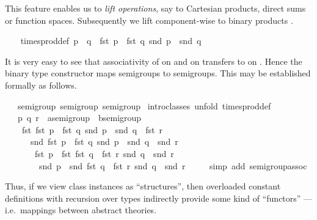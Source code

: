 \begin{isabellebody}
\begin{isamarkuptext}
 This feature enables us to \emph{lift operations}, say to Cartesian
 products, direct sums or function spaces.  Subsequently we lift
 \isa{{\isasymodot}} component-wise to binary products .%
\end{isamarkuptext}%
\ {\isacharparenleft}\isanewline
\ \ times{\isacharunderscore}prod{\isacharunderscore}def{\isacharcolon}\ {\isachardoublequote}p\ {\isasymodot}\ q\ {\isasymequiv}\ {\isacharparenleft}fst\ p\ {\isasymodot}\ fst\ q{\isacharcomma}\ snd\ p\ {\isasymodot}\ snd\ q{\isacharparenright}{\isachardoublequote}%
\begin{isamarkuptext}%
It is very easy to see that associativity of \isa{{\isasymodot}} on 
 and \isa{{\isasymodot}} on  transfers to \isa{{\isasymodot}} on .  Hence the binary type constructor \isa{{\isasymodot}} maps semigroups to
 semigroups.  This may be established formally as follows.%
\end{isamarkuptext}%
\ {\isacharasterisk}\ {\isacharcolon}{\isacharcolon}\ {\isacharparenleft}semigroup{\isacharcomma}\ semigroup{\isacharparenright}\ semigroup\isanewline
{}\ {\isacharparenleft}intro{\isacharunderscore}classes{\isacharcomma}\ unfold\ times{\isacharunderscore}prod{\isacharunderscore}def{\isacharparenright}\isanewline
\ \ \ p\ q\ r\ {\isacharcolon}{\isacharcolon}\ {\isachardoublequote}{\isacharprime}a{\isasymColon}semigroup\ {\isasymtimes}\ {\isacharprime}b{\isasymColon}semigroup{\isachardoublequote}\isanewline
\ \ \isanewline
\ \ \ \ {\isachardoublequote}{\isacharparenleft}fst\ {\isacharparenleft}fst\ p\ {\isasymodot}\ fst\ q{\isacharcomma}\ snd\ p\ {\isasymodot}\ snd\ q{\isacharparenright}\ {\isasymodot}\ fst\ r{\isacharcomma}\isanewline
\ \ \ \ \ \ snd\ {\isacharparenleft}fst\ p\ {\isasymodot}\ fst\ q{\isacharcomma}\ snd\ p\ {\isasymodot}\ snd\ q{\isacharparenright}\ {\isasymodot}\ snd\ r{\isacharparenright}\ {\isacharequal}\isanewline
\ \ \ \ \ \ \ {\isacharparenleft}fst\ p\ {\isasymodot}\ fst\ {\isacharparenleft}fst\ q\ {\isasymodot}\ fst\ r{\isacharcomma}\ snd\ q\ {\isasymodot}\ snd\ r{\isacharparenright}{\isacharcomma}\isanewline
\ \ \ \ \ \ \ \ snd\ p\ {\isasymodot}\ snd\ {\isacharparenleft}fst\ q\ {\isasymodot}\ fst\ r{\isacharcomma}\ snd\ q\ {\isasymodot}\ snd\ r{\isacharparenright}{\isacharparenright}{\isachardoublequote}\isanewline
\ \ \ \ \ {\isacharparenleft}simp\ add{\isacharcolon}\ semigroup{\isachardot}assoc{\isacharparenright}\isanewline
{}%
\begin{isamarkuptext}%
Thus, if we view class instances as ``structures'', then overloaded
 constant definitions with recursion over types indirectly provide
 some kind of ``functors'' --- i.e.\ mappings between abstract
 theories.%
\end{isamarkuptext}%
\end{isabellebody}%
